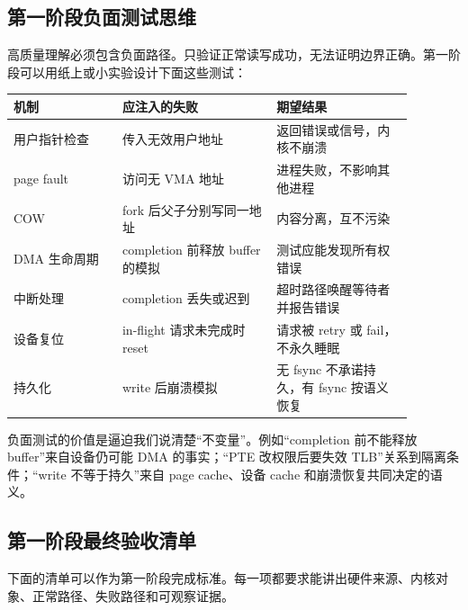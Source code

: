 \subsection{第一阶段负面测试思维}

高质量理解必须包含负面路径。只验证正常读写成功，无法证明边界正确。第一阶段可以用纸上或小实验设计下面这些测试：

\begin{longtable}{p{0.24\linewidth}p{0.34\linewidth}p{0.3\linewidth}}
\toprule
机制 & 应注入的失败 & 期望结果 \\
\midrule
用户指针检查 & 传入无效用户地址 & 返回错误或信号，内核不崩溃 \\
page fault & 访问无 VMA 地址 & 进程失败，不影响其他进程 \\
COW & fork 后父子分别写同一地址 & 内容分离，互不污染 \\
DMA 生命周期 & completion 前释放 buffer 的模拟 & 测试应能发现所有权错误 \\
中断处理 & completion 丢失或迟到 & 超时路径唤醒等待者并报告错误 \\
设备复位 & in-flight 请求未完成时 reset & 请求被 retry 或 fail，不永久睡眠 \\
持久化 & write 后崩溃模拟 & 无 fsync 不承诺持久，有 fsync 按语义恢复 \\
\bottomrule
\end{longtable}

负面测试的价值是逼迫我们说清楚“不变量”。例如“completion 前不能释放 buffer”来自设备仍可能 DMA 的事实；“PTE 改权限后要失效 TLB”关系到隔离条件；“write 不等于持久”来自 page cache、设备 cache 和崩溃恢复共同决定的语义。

\subsection{第一阶段最终验收清单}

下面的清单可以作为第一阶段完成标准。每一项都要求能讲出硬件来源、内核对象、正常路径、失败路径和可观察证据。

